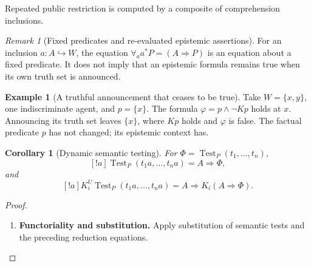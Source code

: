 \documentclass[11pt,a4paper]{article}
\numberwithin{equation}{section}
\newtheorem{corollary}[theorem]{Corollary}
\theoremstyle{definition}
\newtheorem{example}[theorem]{Example}
\theoremstyle{remark}
\newtheorem{remark}[theorem]{Remark}
\theoremstyle{plain}
\begin{document}
\noindent Repeated public restriction is computed by a composite of comprehension inclusions.
\begin{center}
\end{center}

\begin{remark}[Fixed predicates and re-evaluated epistemic assertions]
\label{rem:egt-announcement-reevaluation}
For an inclusion $a:A\hookrightarrow W$, the equation
$\forall_a a^*P=(A\Rightarrow P)$ is an equation about a fixed predicate.
It does not imply that an epistemic formula remains true when its own
truth set is announced.

\end{remark}

\begin{example}[A truthful announcement that ceases to be true]
\label{ex:egt-announcement-success}
Take $W=\{x,y\}$, one indiscriminate agent, and $p=\{x\}$.
The formula $\varphi=p\wedge\neg Kp$ holds at $x$. Announcing its
truth set leaves $\{x\}$, where $Kp$ holds and $\varphi$ is false.
The factual predicate $p$ has not changed; its epistemic context has.
\end{example}

\begin{corollary}[Dynamic semantic testing]
\label{prop:egt-dynamic-semantic-testing}
For $\Phi=\operatorname{Test}_P(t_1,\ldots,t_n)$,
\begin{equation}\label{eq:egt-dynamic-test-reduction}
 [!a]\operatorname{Test}_P(t_1a,\ldots,t_na)=A\Rightarrow\Phi,
\end{equation}
and
\begin{equation}\label{eq:egt-dynamic-epistemic-test}
 [!a]K_i^U\operatorname{Test}_P(t_1a,\ldots,t_na)
 =A\Rightarrow K_i(A\Rightarrow\Phi).
\end{equation}
\end{corollary}
\begin{proof}
\leavevmode
\begin{enumerate}[label=\textup{(\arabic*)},leftmargin=*,itemsep=4pt,topsep=3pt]
  \item \textbf{Functoriality and substitution.} Apply substitution of semantic tests and the preceding reduction equations.
\end{enumerate}
\end{proof}
\end{document}
